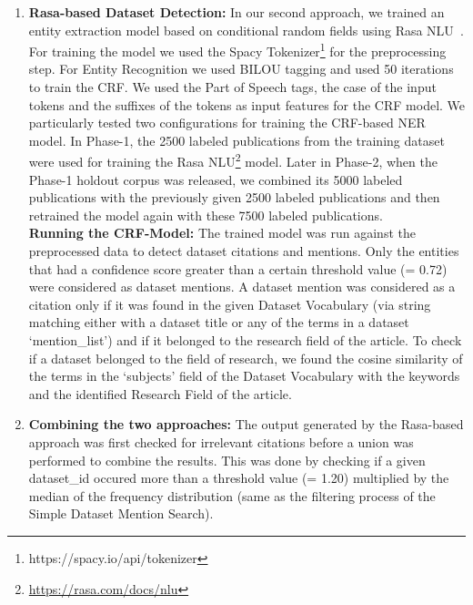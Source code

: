 \documentclass[runningheads]{llncs}
\begin{document}
\begin{enumerate}
\item \textbf{Rasa-based Dataset Detection:}
In our second approach, we trained an entity extraction model based on conditional random fields using Rasa NLU~\cite{DBLP:journals/corr/abs-1712-05181}. For training the model we used the Spacy Tokenizer\footnote{https://spacy.io/api/tokenizer} for the preprocessing step. For Entity Recognition we used BILOU tagging and used 50 iterations to train the CRF. We used the Part of Speech tags, the case of the input tokens and the suffixes of the tokens as input features for the CRF model.
We particularly tested two configurations for training the CRF-based NER model. In Phase-1, the 2500 labeled publications from the training dataset were used for training the Rasa NLU\footnote{\url{https://rasa.com/docs/nlu}} model. Later in Phase-2, when the Phase-1 holdout corpus was released, we combined its 5000 labeled publications with the previously given 2500 labeled publications and then retrained the model again with these 7500 labeled publications. %
\\
\textbf{Running the CRF-Model:} The trained model was run against the preprocessed data to detect dataset citations and mentions. Only the entities that had a confidence score greater than a certain threshold value (= 0.72) were considered as dataset mentions. A dataset mention was considered as a citation only if it was found in the given Dataset Vocabulary (via string matching either with a dataset title or any of the terms in a dataset `mention\_list') and if it belonged to the research field of the article. %
To check if a dataset belonged to the field of research, we found the cosine similarity of the terms in the ‘subjects’ field of the Dataset Vocabulary with the keywords and the identified Research Field of the article.
\smallskip
\item \textbf{Combining the two approaches:}
The output generated by the Rasa-based approach was first checked for irrelevant citations before a union was performed to combine the results.
This was done by checking if a given dataset\_id occured more than a threshold value (= 1.20) multiplied by the median of the frequency distribution (same as the filtering process of the Simple Dataset Mention Search). %
\end{enumerate}
\end{document}
